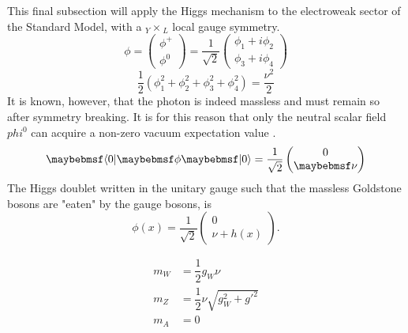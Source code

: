 This final subsection will apply the Higgs mechanism to the electroweak sector of the Standard Model, with a $_Y\times$$_{L}$ local gauge symmetry. 
\begin{equation}
    \phi=
    \begin{pmatrix}
         \phi^+ \\
         \phi^0
    \end{pmatrix}
    =\dfrac{1}{\sqrt{2}}
    \begin{pmatrix}
         \phi_1+i\phi_2\\
         \phi_3+i\phi_4
    \end{pmatrix}
\end{equation}
\begin{equation}
    \dfrac{1}{2}(\phi_{1}^2+\phi_{2}^2+\phi_{3}^2+\phi_{4}^2)=\dfrac{\nu^2}{2}
\end{equation}
It is known, however, that the photon is indeed massless and must remain so after symmetry breaking. It is for this reason that only the neutral scalar field $phi^0$ can acquire a non-zero vacuum expectation value .
\begin{equation}
    \bra{0}\phi\ket{0}=\dfrac{1}{\sqrt{2}}
    \begin{pmatrix}
         0 \\
         \nu
    \end{pmatrix}
\end{equation}
The Higgs doublet written in the unitary gauge such that the massless Goldstone bosons are "eaten" by the gauge bosons, is
\begin{equation}
    \phi(x)=\dfrac{1}{\sqrt{2}}
    \begin{pmatrix}
         0\\
         \nu+h(x)
    \end{pmatrix}.
\end{equation}

\begin{align}
    m_W & =\dfrac{1}{2}g_{W}\nu\\
    m_Z & =\dfrac{1}{2}\nu\sqrt{g_W^2+g'^2}\\
    m_A & =0
\end{align}